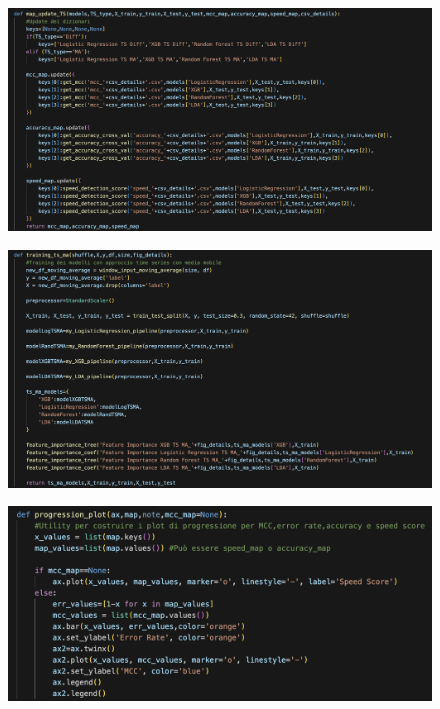 \begin{appendices}
\begin{figure}[H]
    \centering
    \includegraphics[width=1\linewidth]{18.png}
    \label{fig:enter-label}
\end{figure}

\begin{figure}[H]
    \centering
    \includegraphics[width=1\linewidth]{19.png}
    \label{fig:enter-label}
\end{figure}

\begin{figure}[H]
    \centering
    \includegraphics[width=1\linewidth]{20.png}
    \label{fig:enter-label}
\end{figure}


\end{appendices}
